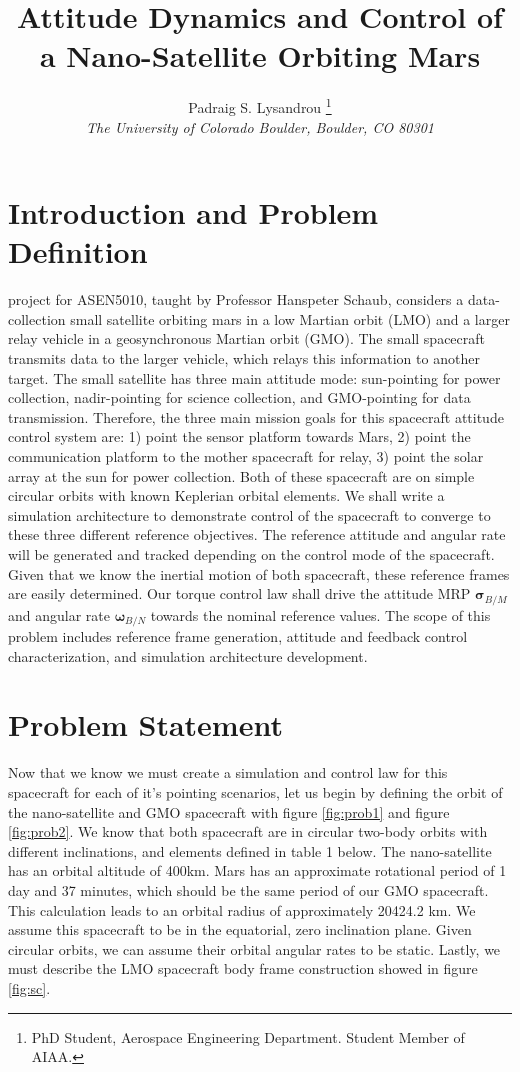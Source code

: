 \documentclass[paper]{aiaaNew}
\title{Attitude Dynamics and Control of a Nano-Satellite Orbiting Mars}
\author{Padraig S. Lysandrou
  \thanks{PhD Student, Aerospace Engineering Department.  Student Member of AIAA.}
  \\
  \emph{\normalsize The University of Colorado Boulder, Boulder, CO 80301}
}
\begin{document}
\maketitle

\section*{Introduction and Problem Definition}
 project for ASEN5010, taught by Professor Hanspeter Schaub, considers a data-collection small satellite orbiting mars in a low Martian orbit (LMO) and a larger relay vehicle in a geosynchronous Martian orbit (GMO). The small spacecraft transmits data to the larger vehicle, which relays this information to another target. The small satellite has three main attitude mode: sun-pointing for power collection, nadir-pointing for science collection, and GMO-pointing for data transmission. Therefore, the three main mission goals for this spacecraft attitude control system are: 1) point the sensor platform towards Mars, 2) point the communication platform to the mother spacecraft for relay, 3) point the solar array at the sun for power collection. Both of these spacecraft are on simple circular orbits with known Keplerian orbital elements. We shall write a simulation architecture to demonstrate control of the spacecraft to converge to these three different reference objectives. The reference attitude and angular rate will be generated and tracked depending on the control mode of the spacecraft. Given that we know the inertial motion of both spacecraft, these reference frames are easily determined. Our torque control law shall drive the attitude MRP $\bm{\sigma}_{B/M}$ and angular rate $\bm{\omega}_{B/N}$ towards the nominal reference values. The scope of this problem includes reference frame generation, attitude and feedback control characterization, and simulation architecture development.





\section*{Problem Statement}
Now that we know we must create a simulation and control law for this spacecraft for each of it's pointing scenarios, let us begin by defining the orbit of the nano-satellite and GMO spacecraft with figure \ref{fig:prob1} and figure \ref{fig:prob2}. We know that both spacecraft are in circular two-body orbits with different inclinations, and elements defined in table 1 below. The nano-satellite has an orbital altitude of 400km. Mars has an approximate rotational period of 1 day and 37 minutes, which should be the same period of our GMO spacecraft. This calculation leads to an orbital radius of approximately 20424.2 km. We assume this spacecraft to be in the equatorial, zero inclination plane. Given circular orbits, we can assume their orbital angular rates to be static. Lastly, we must describe the LMO spacecraft body frame construction showed in figure \ref{fig:sc}.
\end{document}
